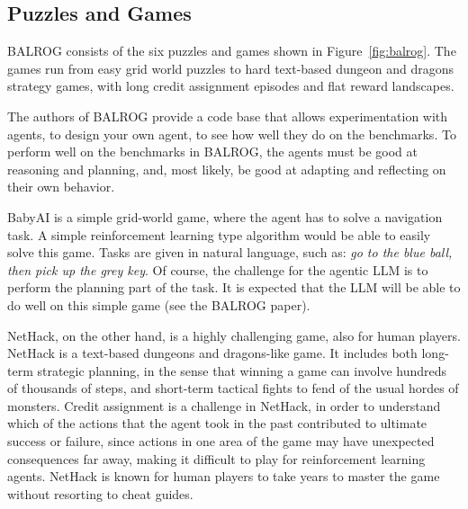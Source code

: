 \subsection{Puzzles and Games}
BALROG  consists of the six puzzles and games shown in Figure~\ref{fig:balrog}. The games run from easy grid world puzzles to hard text-based dungeon and dragons strategy games, with long credit assignment episodes and flat reward landscapes.

The authors of BALROG provide a code base that allows experimentation with agents, to design your own agent, to see how well they do on the benchmarks. To perform well on the benchmarks in BALROG, the agents must be good at reasoning and planning, and, most likely, be good at adapting and reflecting on their own behavior. 





BabyAI is a simple grid-world game, where the agent has to solve a navigation task. A simple reinforcement learning type algorithm would be able to easily solve this game. Tasks are given in natural language, such as: {\em go to the blue ball, then pick up the grey key}. Of course, the challenge for the agentic LLM is to perform the planning part of the task. It is expected that the LLM will be able to do well on this simple game (see the BALROG paper). 

NetHack, on the other hand, is a highly challenging game, also for human players. NetHack is a text-based dungeons and dragons-like game. It includes both
long-term strategic planning, in the sense that winning a game can involve hundreds of thousands of steps, and  short-term tactical fights to fend of the usual hordes of monsters. Credit assignment is  a challenge in NetHack, in order to  understand which of the actions that the agent took in the past contributed to ultimate success or failure, since actions in one area of the game may have unexpected consequences far away, making it difficult to play for reinforcement learning agents. NetHack is known for  human players to take years to
master the game without resorting to cheat guides.

